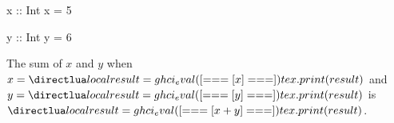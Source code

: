\documentclass{article}
\begin{document}
\begin{ghci}
x :: Int
x = 5

y :: Int
y = 6
\end{ghci}

The sum of $x$ and $y$ when $x = \hask{x}$ and $y = \hask{y}$ is $\hask{x + y}$.
\end{document}
